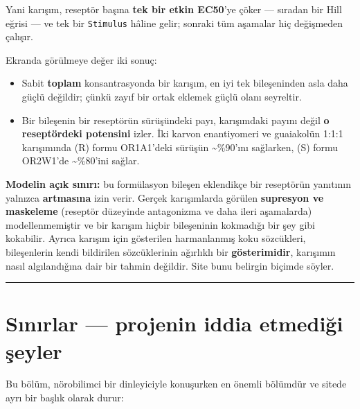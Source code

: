 \documentclass[11pt,a4paper]{article}
\begin{document}
Yani karışım, reseptör başına \textbf{tek bir etkin EC50}'ye çöker — sıradan bir Hill eğrisi — ve tek bir \texttt{\small Stimulus} hâline gelir; sonraki tüm aşamalar hiç değişmeden çalışır.

Ekranda görülmeye değer iki sonuç:

\begin{itemize}
\item Sabit \textbf{toplam} konsantrasyonda bir karışım, en iyi tek bileşeninden asla daha güçlü değildir; çünkü zayıf bir ortak eklemek güçlü olanı seyreltir.
\item Bir bileşenin bir reseptörün sürüşündeki payı, karışımdaki payını değil \textbf{o reseptördeki potensini} izler. İki karvon enantiyomeri ve guaiakolün 1:1:1 karışımında (R) formu OR1A1'deki sürüşün \textasciitilde{}\%90'ını sağlarken, (S) formu OR2W1'de \textasciitilde{}\%80'ini sağlar.
\end{itemize}

\textbf{Modelin açık sınırı:} bu formülasyon bileşen eklendikçe bir reseptörün yanıtının yalnızca \textbf{artmasına} izin verir. Gerçek karışımlarda görülen \textbf{supresyon ve maskeleme} (reseptör düzeyinde antagonizma ve daha ileri aşamalarda) modellenmemiştir ve bir karışım hiçbir bileşeninin kokmadığı bir şey gibi kokabilir. Ayrıca karışım için gösterilen harmanlanmış koku sözcükleri, bileşenlerin kendi bildirilen sözcüklerinin ağırlıklı bir \textbf{gösterimidir}, karışımın nasıl algılandığına dair bir tahmin değildir. Site bunu belirgin biçimde söyler.


\vspace{0.4\baselineskip}
\hrule
\vspace{0.9\baselineskip}


\section{Sınırlar — projenin iddia \textbf{etmediği} şeyler}

Bu bölüm, nörobilimci bir dinleyiciyle konuşurken en önemli bölümdür ve sitede ayrı bir başlık olarak durur:
\end{document}
